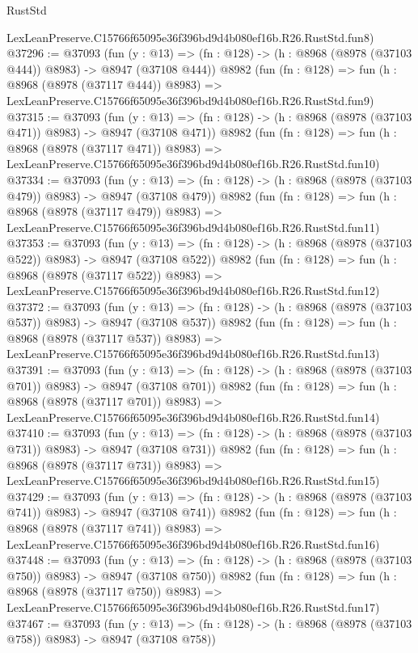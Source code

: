 \begin{lexlean}{RustStd}
\begin{coremodule}
    LexLeanPreserve.C15766f65095e36f396bd9d4b080ef16b.R26.RustStd.fun8)
@37296 := @37093
    (fun (y : @13) => (fn : @128) -> (h : @8968 (@8978 (@37103 @444)) @8983) -> @8947 (@37108 @444))
    @8982
    (fun (fn : @128) =>
    fun (h : @8968 (@8978 (@37117 @444)) @8983) =>
    LexLeanPreserve.C15766f65095e36f396bd9d4b080ef16b.R26.RustStd.fun9)
@37315 := @37093
    (fun (y : @13) => (fn : @128) -> (h : @8968 (@8978 (@37103 @471)) @8983) -> @8947 (@37108 @471))
    @8982
    (fun (fn : @128) =>
    fun (h : @8968 (@8978 (@37117 @471)) @8983) =>
    LexLeanPreserve.C15766f65095e36f396bd9d4b080ef16b.R26.RustStd.fun10)
@37334 := @37093
    (fun (y : @13) => (fn : @128) -> (h : @8968 (@8978 (@37103 @479)) @8983) -> @8947 (@37108 @479))
    @8982
    (fun (fn : @128) =>
    fun (h : @8968 (@8978 (@37117 @479)) @8983) =>
    LexLeanPreserve.C15766f65095e36f396bd9d4b080ef16b.R26.RustStd.fun11)
@37353 := @37093
    (fun (y : @13) => (fn : @128) -> (h : @8968 (@8978 (@37103 @522)) @8983) -> @8947 (@37108 @522))
    @8982
    (fun (fn : @128) =>
    fun (h : @8968 (@8978 (@37117 @522)) @8983) =>
    LexLeanPreserve.C15766f65095e36f396bd9d4b080ef16b.R26.RustStd.fun12)
@37372 := @37093
    (fun (y : @13) => (fn : @128) -> (h : @8968 (@8978 (@37103 @537)) @8983) -> @8947 (@37108 @537))
    @8982
    (fun (fn : @128) =>
    fun (h : @8968 (@8978 (@37117 @537)) @8983) =>
    LexLeanPreserve.C15766f65095e36f396bd9d4b080ef16b.R26.RustStd.fun13)
@37391 := @37093
    (fun (y : @13) => (fn : @128) -> (h : @8968 (@8978 (@37103 @701)) @8983) -> @8947 (@37108 @701))
    @8982
    (fun (fn : @128) =>
    fun (h : @8968 (@8978 (@37117 @701)) @8983) =>
    LexLeanPreserve.C15766f65095e36f396bd9d4b080ef16b.R26.RustStd.fun14)
@37410 := @37093
    (fun (y : @13) => (fn : @128) -> (h : @8968 (@8978 (@37103 @731)) @8983) -> @8947 (@37108 @731))
    @8982
    (fun (fn : @128) =>
    fun (h : @8968 (@8978 (@37117 @731)) @8983) =>
    LexLeanPreserve.C15766f65095e36f396bd9d4b080ef16b.R26.RustStd.fun15)
@37429 := @37093
    (fun (y : @13) => (fn : @128) -> (h : @8968 (@8978 (@37103 @741)) @8983) -> @8947 (@37108 @741))
    @8982
    (fun (fn : @128) =>
    fun (h : @8968 (@8978 (@37117 @741)) @8983) =>
    LexLeanPreserve.C15766f65095e36f396bd9d4b080ef16b.R26.RustStd.fun16)
@37448 := @37093
    (fun (y : @13) => (fn : @128) -> (h : @8968 (@8978 (@37103 @750)) @8983) -> @8947 (@37108 @750))
    @8982
    (fun (fn : @128) =>
    fun (h : @8968 (@8978 (@37117 @750)) @8983) =>
    LexLeanPreserve.C15766f65095e36f396bd9d4b080ef16b.R26.RustStd.fun17)
@37467 := @37093
    (fun (y : @13) => (fn : @128) -> (h : @8968 (@8978 (@37103 @758)) @8983) -> @8947 (@37108 @758))

\end{coremodule}
\end{lexlean}
